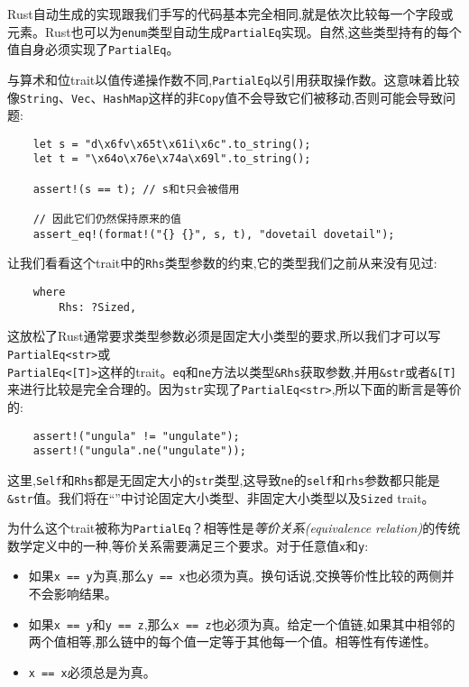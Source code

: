 Rust自动生成的实现跟我们手写的代码基本完全相同,就是依次比较每一个字段或元素。Rust也可以为\texttt{enum}类型自动生成\texttt{PartialEq}实现。自然,这些类型持有的每个值自身必须实现了\texttt{PartialEq}。

与算术和位trait以值传递操作数不同,\texttt{PartialEq}以引用获取操作数。这意味着比较像\texttt{String}、\texttt{Vec}、\texttt{HashMap}这样的非\texttt{Copy}值不会导致它们被移动,否则可能会导致问题:
\begin{verbatim}
    let s = "d\x6fv\x65t\x61i\x6c".to_string();
    let t = "\x64o\x76e\x74a\x69l".to_string();

    assert!(s == t); // s和t只会被借用

    // 因此它们仍然保持原来的值
    assert_eq!(format!("{} {}", s, t), "dovetail dovetail");
\end{verbatim}

让我们看看这个trait中的\texttt{Rhs}类型参数的约束,它的类型我们之前从来没有见过:
\begin{verbatim}
    where
        Rhs: ?Sized,
\end{verbatim}

这放松了Rust通常要求类型参数必须是固定大小类型的要求,所以我们才可以写\texttt{PartialEq<str>}或\\
\texttt{PartialEq<[T]>}这样的trait。\texttt{eq}和\texttt{ne}方法以类型\texttt{\&Rhs}获取参数,并用\texttt{\&str}或者\texttt{\&[T]}来进行比较是完全合理的。因为\texttt{str}实现了\texttt{PartialEq<str>},所以下面的断言是等价的:
\begin{verbatim}
    assert!("ungula" != "ungulate");
    assert!("ungula".ne("ungulate"));
\end{verbatim}

这里,\texttt{Self}和\texttt{Rhs}都是无固定大小的\texttt{str}类型,这导致\texttt{ne}的\texttt{self}和\texttt{rhs}参数都只能是\texttt{\&str}值。我们将在“”中讨论固定大小类型、非固定大小类型以及\texttt{Sized} trait。

为什么这个trait被称为\texttt{PartialEq}？相等性是\emph{等价关系(equivalence relation)}的传统数学定义中的一种,等价关系需要满足三个要求。对于任意值\texttt{x}和\texttt{y}:
\begin{itemize}
    \item 如果\texttt{x == y}为真,那么\texttt{y == x}也必须为真。换句话说,交换等价性比较的两侧并不会影响结果。
    \item 如果\texttt{x == y}和\texttt{y == z},那么\texttt{x == z}也必须为真。给定一个值链,如果其中相邻的两个值相等,那么链中的每个值一定等于其他每一个值。相等性有传递性。
    \item \texttt{x == x}必须总是为真。
\end{itemize}

